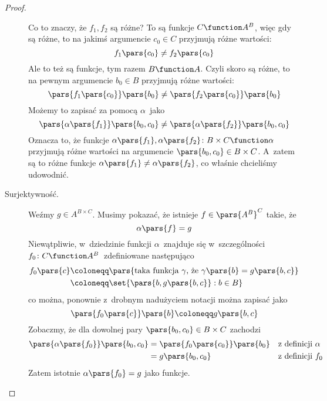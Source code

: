 \begin{proof}
\begin{description}
        Co to znaczy, że \(f_1, f_2\) są różne? To są funkcje \(C \function A^B\), więc gdy są różne, to na jakimś argumencie \(c_0 \in C\) przyjmują różne wartości:
        \begin{equation*}
            f_1\pars{c_0} \neq f_2\pars{c_0}
        \end{equation*}
        Ale to też są funkcje, tym razem \(B \function A\). Czyli skoro są różne, to na pewnym argumencie \(b_0 \in B\) przyjmują różne wartości:
        \begin{equation*}
            \pars{f_1\pars{c_0}}\pars{b_0} \neq \pars{f_2\pars{c_0}}\pars{b_0}
        \end{equation*}
        Możemy to zapisać za pomocą \(\alpha\)~jako
        \begin{equation*}
            \pars{\alpha\pars{f_1}}\pars{b_0, c_0} \neq \pars{\alpha\pars{f_2}}\pars{b_0, c_0}
        \end{equation*}
        Oznacza to, że funkcje \(\alpha\pars{f_1}, \alpha\pars{f_2}\colon B \times C \function \alpha\) przyjmują różne wartości na argumencie \(\pars{b_0, c_0} \in B \times C\). A~zatem są to różne funkcje \(\alpha\pars{f_1} \neq \alpha\pars{f_2}\), co właśnie chcieliśmy udowodnić.
    \item[Surjektywność.] Weźmy \(g \in A^{B \times C}\). Musimy pokazać, że istnieje \(f \in \pars{A^B}^C\) takie, że
        \begin{equation*}
            \alpha\pars{f} = g
        \end{equation*}
        Niewątpliwie, w~dziedzinie funkcji \(\alpha\)~znajduje się w~szczególności \(f_0\colon C \function A^B\)~zdefiniowane następująco
        \begin{equation*}
            \begin{split}
                f_0\pars{c}
                    &\coloneqq \pars{\text{taka funkcja \(\gamma\), że \(\gamma\pars{b} = g\pars{b, c}\)}}\\
                    &\coloneqq \set{\pars{b, g\pars{b, c}} : b \in B}
            \end{split}
        \end{equation*}
        co można, ponownie z~drobnym nadużyciem notacji można zapisać jako
        \begin{equation*}
            \pars{f_0\pars{c}}\pars{b} \coloneqq g\pars{b, c}
        \end{equation*}
        Zobaczmy, że dla dowolnej pary \(\pars{b_0, c_0} \in B \times C\) zachodzi
        \begin{align*}
            \pars{\alpha\pars{f_0}}\pars{b_0, c_0}
                &= \pars{f_0\pars{c_0}}\pars{b_0} && \text{z~definicji \(\alpha\)}\\
                &= g\pars{b_0, c_0} && \text{z~definicji \(f_0\)}
        \end{align*}
        Zatem istotnie \(\alpha\pars{f_0} = g\) jako funkcje.
\end{description}
\end{proof}